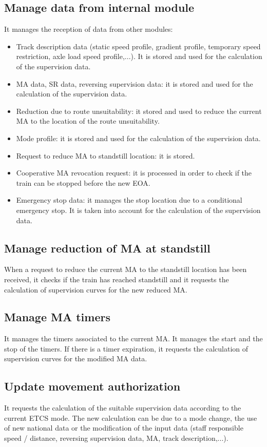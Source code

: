 \documentclass[nocc]{template/openetcs_report}
\begin{document}
\subsection{Manage data from internal module}
It manages the reception of data from other modules:
\begin{itemize}
\item Track description data (static speed profile, gradient profile, temporary speed restriction, axle load speed profile,...). It is stored and used for the calculation of the supervision data.
\item MA data, SR data, reversing supervision data: it is stored and used for the calculation of the supervision data.
\item Reduction due to route unsuitability: it stored and used to reduce the current MA to the location of the route unsuitability.
\item Mode profile: it is stored and used for the calculation of the supervision data.
\item Request to reduce MA to standstill location: it is stored.
\item Cooperative MA revocation request: it is processed in order to check if the train can be stopped before the new EOA.
\item Emergency stop data: it manages the stop location due to a conditional emergency stop. It is taken into account for the calculation of the supervision data.
\end{itemize}

\subsection{Manage reduction of MA at standstill}
When a request to reduce the current MA to the standstill location has been received, it checks if the train has reached standstill and it requests the calculation of supervision curves for the new reduced MA.

\subsection{Manage MA timers}
It manages the timers associated to the current MA. 
It manages the start and the stop of the timers. If there is a timer expiration, it requests the calculation of supervision curves for the modified MA data.

\subsection{Update movement authorization}
It requests the calculation of the suitable supervision data according to the current ETCS mode. The new calculation can be due to a mode change, the use of new national data or the modification of the input data (staff responsible speed / distance, reversing supervision data, MA, track description,...).
\end{document}
